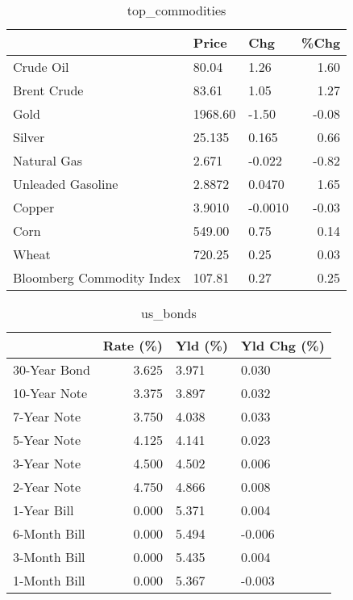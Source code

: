 \documentclass{article}%
\begin{document}
\begin{table}[htbp]%
\caption{top\_commodities}%
\centering%
\begin{adjustbox}{width=1\textwidth}%
\begin{tabular}{lllr}
\toprule
                          &   Price &     Chg &  \%Chg \\
\midrule
               Crude Oil  &   80.04 &    1.26 &  1.60 \\
             Brent Crude  &   83.61 &    1.05 &  1.27 \\
                    Gold  & 1968.60 &   -1.50 & -0.08 \\
                  Silver  &  25.135 &   0.165 &  0.66 \\
             Natural Gas  &   2.671 &  -0.022 & -0.82 \\
       Unleaded Gasoline  &  2.8872 &  0.0470 &  1.65 \\
                  Copper  &  3.9010 & -0.0010 & -0.03 \\
                    Corn  &  549.00 &    0.75 &  0.14 \\
                   Wheat  &  720.25 &    0.25 &  0.03 \\
Bloomberg Commodity Index &  107.81 &    0.27 &  0.25 \\
\bottomrule
\end{tabular}
%
\end{adjustbox}%
\end{table}

%


\begin{table}[htbp]%
\caption{us\_bonds}%
\centering%
\begin{adjustbox}{width=1\textwidth}%
\begin{tabular}{lrll}
\toprule
             &  Rate (\%) & Yld (\%) & Yld Chg (\%) \\
\midrule
30-Year Bond &     3.625 &   3.971 &       0.030 \\
10-Year Note &     3.375 &   3.897 &       0.032 \\
 7-Year Note &     3.750 &   4.038 &       0.033 \\
 5-Year Note &     4.125 &   4.141 &       0.023 \\
 3-Year Note &     4.500 &   4.502 &       0.006 \\
 2-Year Note &     4.750 &   4.866 &       0.008 \\
 1-Year Bill &     0.000 &   5.371 &       0.004 \\
6-Month Bill &     0.000 &   5.494 &      -0.006 \\
3-Month Bill &     0.000 &   5.435 &       0.004 \\
1-Month Bill &     0.000 &   5.367 &      -0.003 \\
\bottomrule
\end{tabular}
%
\end{adjustbox}%
\end{table}
\end{document}
